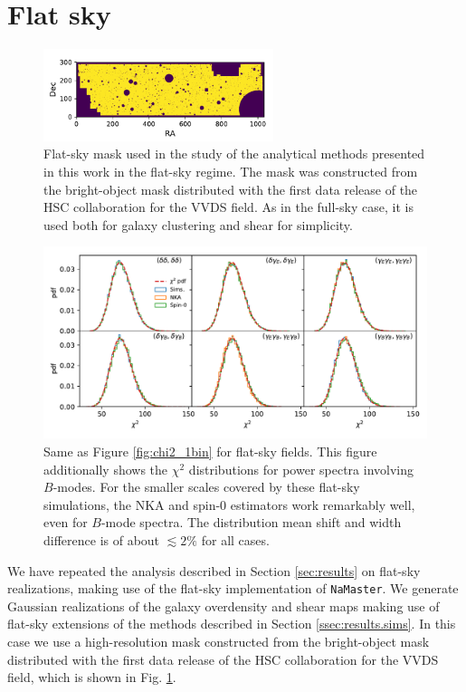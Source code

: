 \documentclass[a4paper,11pt]{article}
\begin{document}
  \appendix
  \section{Flat sky}\label{app:flat}
    \begin{figure}
      \centering
      \includegraphics[width=0.6\textwidth]{./figures/mask-lss_flat1.pdf}
      \caption{Flat-sky mask used in the study of the analytical methods presented in this work in the flat-sky regime. The mask was constructed from the bright-object mask distributed with the first data release of the HSC collaboration \cite{2018PASJ...70S...4A} for the VVDS field. As in the full-sky case, it is used both for galaxy clustering and shear for simplicity.} \label{fig:mask_flat}
    \end{figure}

    \begin{figure}
      \centering
      \includegraphics[width=\textwidth]{./figures/run_chi2_TT_TE_EE_TB_EB_BB.pdf}
      \caption{Same as Figure \ref{fig:chi2_1bin} for flat-sky fields. This
        figure additionally shows the $\chi^2$ distributions for power spectra
        involving $B$-modes. For the smaller scales covered by these flat-sky
        simulations, the NKA and spin-0 estimators work remarkably well, even
        for $B$-mode spectra. The distribution mean shift and width difference
        is of about $\lesssim 2\%$ for all cases.}
      \label{fig:chi2_1bin_flat}
    \end{figure}
    We have repeated the analysis described in Section \ref{sec:results} on flat-sky realizations, making use of the flat-sky implementation of {\tt NaMaster}. We generate Gaussian realizations of the galaxy overdensity and shear maps making use of flat-sky extensions of the methods described in Section \ref{ssec:results.sims}. In this case we use a high-resolution mask constructed from the bright-object mask distributed with the first data release of the HSC collaboration \cite{2018PASJ...70S...4A} for the VVDS field, which is shown in Fig. \ref{fig:mask_flat}. 
    
\end{document}
